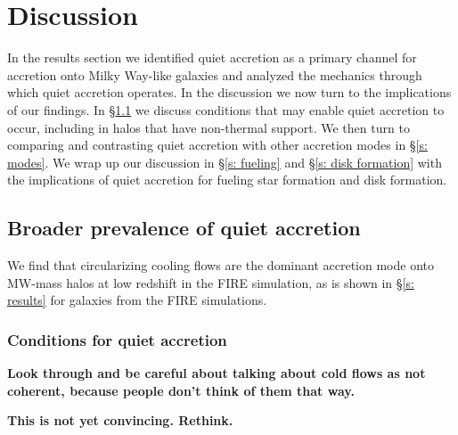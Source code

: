 \documentclass[fleqn,usenatbib]{mnras}
\begin{document}
\section{Discussion}
\label{s: discussion}

In the results section we identified quiet accretion as a primary channel for accretion onto Milky Way-like galaxies and analyzed the mechanics through which quiet accretion operates.
In the discussion we now turn to the implications of our findings.
In \S\ref{s: broader prevalence} we discuss conditions that may enable quiet accretion to occur, including in halos that have non-thermal support.
We then turn to comparing and contrasting quiet accretion with other accretion modes in \S\ref{s: modes}.
We wrap up our discussion in \S\ref{s: fueling} and \S\ref{s: disk formation} with the implications of quiet accretion for fueling star formation and disk formation.

\subsection{Broader prevalence of quiet accretion}
\label{s: broader prevalence}

We find that circularizing cooling flows are the dominant accretion mode onto MW-mass halos at low redshift in the FIRE simulation, as is shown in \S\ref{s: results} for galaxies from the FIRE simulations.

\subsubsection{Conditions for quiet accretion}
\label{s: broader prevalence -- conditions}

\textbf{Look through and be careful about talking about cold flows as not coherent, because people don't think of them that way.}

\textbf{This is not yet convincing. Rethink.}
\end{document}
